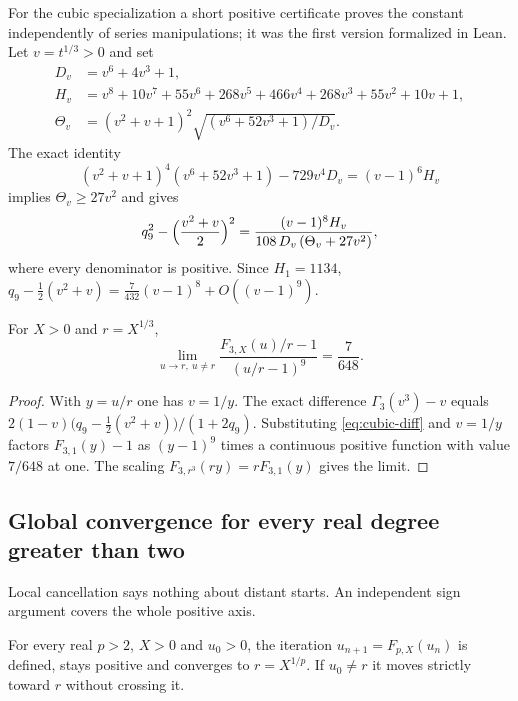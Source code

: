 For the cubic specialization a short positive certificate proves the constant independently of series
manipulations; it was the first version formalized in Lean. Let $v=t^{1/3}>0$ and set
\begin{align*}
D_v&=v^{6}+4v^{3}+1,\\
H_v&=v^{8}+10v^{7}+55v^{6}+268v^{5}+466v^{4}+268v^{3}+55v^{2}+10v+1,\\
\Theta_v&=(v^{2}+v+1)^{2}\sqrt{(v^{6}+52v^{3}+1)/D_v}.
\end{align*}
The exact identity
\begin{equation}\label{eq:cubic-id}
(v^{2}+v+1)^{4}(v^{6}+52v^{3}+1)-729v^{4}D_v=(v-1)^{6}H_v
\end{equation}
implies $\Theta_v\ge27v^{2}$ and gives
\begin{equation}\label{eq:cubic-diff}
q_9^{2}-\Bigl(\frac{v^{2}+v}{2}\Bigr)^{2}=\frac{(v-1)^{8}H_v}{108\,D_v\,(\Theta_v+27v^{2})},
\end{equation}
where every denominator is positive. Since $H_1=1134$,
$q_9-\tfrac12(v^{2}+v)=\tfrac{7}{432}(v-1)^{8}+O((v-1)^{9})$.

\begin{theorem}\label{thm:cubic}
For $X>0$ and $r=X^{1/3}$,
\[ \lim_{u\to r,\ u\neq r}\frac{F_{3,X}(u)/r-1}{(u/r-1)^{9}}=\frac{7}{648}. \]
\end{theorem}
\begin{proof}
With $y=u/r$ one has $v=1/y$. The exact difference $\Gamma_3(v^{3})-v$ equals
$2(1-v)\bigl(q_9-\tfrac12(v^{2}+v)\bigr)/(1+2q_9)$. Substituting \eqref{eq:cubic-diff} and $v=1/y$
factors $F_{3,1}(y)-1$ as $(y-1)^{9}$ times a continuous positive function with value $7/648$ at one.
The scaling $F_{3,r^{3}}(ry)=rF_{3,1}(y)$ gives the limit.
\end{proof}

\subsection{Global convergence for every real degree greater than two}

Local cancellation says nothing about distant starts. An independent sign argument covers the whole
positive axis.

\begin{theorem}\label{thm:global}
For every real $p>2$, $X>0$ and $u_0>0$, the iteration $u_{n+1}=F_{p,X}(u_n)$ is defined, stays positive
and converges to $r=X^{1/p}$. If $u_0\neq r$ it moves strictly toward $r$ without crossing it.
\end{theorem}

